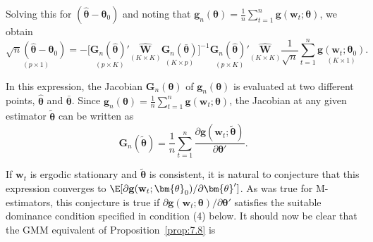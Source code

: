 Solving this for $(\hat{\bm{\theta}} - \bm{\theta}_0)$ and noting that $\mathbf{g}_n(\bm{\theta}) = \frac{1}{n}\sum_{t=1}^{n}\mathbf{g}(\mathbf{w}_t; \bm{\theta})$, we obtain
\begin{equation}
\label{eq:7.3.32}
\underset{(p \times 1)}{\sqrt{n}(\hat{\bm{\theta}} - \bm{\theta}_0)} = -\bigl[\underset{(p \times K)}{\mathbf{G}_n(\hat{\bm{\theta}})'} \underset{(K \times K)}{\widehat{\mathbf{W}}} \underset{(K \times p)}{\mathbf{G}_n(\bar{\bm{\theta}})}\bigr]^{-1} \underset{(p \times K)}{\mathbf{G}_n(\hat{\bm{\theta}})'} \underset{(K \times K)}{\widehat{\mathbf{W}}} \frac{1}{\sqrt{n}}\sum_{t=1}^{n}\underset{(K \times 1)}{\mathbf{g}(\mathbf{w}_t; \bm{\theta}_0)}.
\end{equation}

In this expression, the Jacobian $\mathbf{G}_n(\bm{\theta})$ of $\mathbf{g}_n(\bm{\theta})$ is evaluated at two different points, $\hat{\bm{\theta}}$ and $\bar{\bm{\theta}}$. Since $\mathbf{g}_n(\bm{\theta}) = \frac{1}{n}\sum_{t=1}^{n}\mathbf{g}(\mathbf{w}_t; \bm{\theta})$, the Jacobian at any given estimator $\tilde{\bm{\theta}}$ can be written as
\begin{equation}
\label{eq:7.3.33}
\mathbf{G}_n(\tilde{\bm{\theta}}) = \frac{1}{n}\sum_{t=1}^{n}\frac{\partial\mathbf{g}(\mathbf{w}_t; \tilde{\bm{\theta}})}{\partial\bm{\theta}'}.
\end{equation}

If $\mathbf{w}_t$ is ergodic stationary and $\tilde{\bm{\theta}}$ is consistent, it is natural to conjecture that this expression converges to $\E[\partial\mathbf{g}(\mathbf{w}_t; \bm{\theta}_0)/\partial\bm{\theta}']$. As was true for M-estimators, this conjecture is true if $\partial\mathbf{g}(\mathbf{w}_t; \bm{\theta})/\partial\bm{\theta}'$ satisfies the suitable dominance condition specified in condition (4) below. It should now be clear that the GMM equivalent of Proposition~\ref{prop:7.8} is

